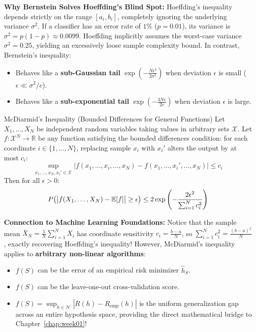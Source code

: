 \textbf{Why Bernstein Solves Hoeffding's Blind Spot:}
Hoeffding's inequality depends strictly on the range $[a_i, b_i]$, completely ignoring the underlying variance $\sigma^2$. If a classifier has an error rate of $1\%$ ($p = 0.01$), its variance is $\sigma^2 = p(1-p) \approx 0.0099$. Hoeffding implicitly assumes the worst-case variance $\sigma^2 = 0.25$, yielding an excessively loose sample complexity bound. In contrast, Bernstein's inequality:
\begin{itemize}
    \item Behaves like a \textbf{sub-Gaussian tail} $\exp\left(-\frac{N\epsilon^2}{2\sigma^2}\right)$ when deviation $\epsilon$ is small ($\epsilon \ll \sigma^2/c$).
    \item Behaves like a \textbf{sub-exponential tail} $\exp\left(-\frac{3N\epsilon}{2c}\right)$ when deviation $\epsilon$ is large.
\end{itemize}

\begin{theorembox}{McDiarmid's Inequality (Bounded Differences for General Functions)}
Let $X_1, \dots, X_N$ be independent random variables taking values in arbitrary sets $\mathcal{X}$. Let $f: \mathcal{X}^N \to \mathbb{R}$ be any function satisfying the bounded differences condition: for each coordinate $i \in \{1, \dots, N\}$, replacing sample $x_i$ with $x_i'$ alters the output by at most $c_i$:
\begin{equation}
\sup_{x_1, \dots, x_N, x_i' \in \mathcal{X}} \big| f(x_1, \dots, x_i, \dots, x_N) - f(x_1, \dots, x_i', \dots, x_N) \big| \le c_i
\end{equation}
Then for all $\epsilon > 0$:
\begin{equation}
P\big( \big| f(X_1, \dots, X_N) - \operatorname{\mathbb{E}}[f] \big| \ge \epsilon \big) \le 2 \exp\left( -\frac{2\epsilon^2}{\sum_{i=1}^N c_i^2} \right)
\label{eq:mcdiarmid_ineq}
\end{equation}
\end{theorembox}

\textbf{Connection to Machine Learning Foundations:}
Notice that the sample mean $\bar{X}_N = \frac{1}{N}\sum_{i=1}^N X_i$ has coordinate sensitivity $c_i = \frac{b - a}{N}$, so $\sum_{i=1}^N c_i^2 = \frac{(b-a)^2}{N}$, exactly recovering Hoeffding's inequality! However, McDiarmid's inequality applies to \textbf{arbitrary non-linear algorithms}:
\begin{itemize}
    \item $f(S)$ can be the error of an empirical risk minimizer $\hat{h}_S$.
    \item $f(S)$ can be the leave-one-out cross-validation score.
    \item $f(S) = \sup_{h \in \mathcal{H}} |R(h) - R_{\text{emp}}(h)|$ is the uniform generalization gap across an entire hypothesis space, providing the direct mathematical bridge to Chapter~\ref{chap:week01}!
\end{itemize}

